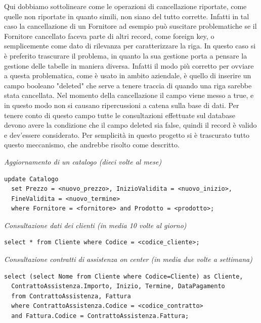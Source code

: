 \noindent
Qui dobbiamo sottolineare come le operazioni di cancellazione riportate, come quelle non riportate in quanto simili, non siano del tutto corrette. Infatti in tal caso la cancellazione di un Fornitore ad esempio può suscitare problematiche se il Fornitore cancellato faceva parte di altri record, come foreign key, o semplicemente come dato di rilevanza per caratterizzare la riga. In questo caso si è preferito trascurare il problema, in quanto la sua gestione porta a pensare la gestione delle tabelle in maniera diversa. Infatti il modo più corretto per ovviare a questa problematica, come è usato in ambito aziendale, è quello di inserire un campo booleano "deleted" che serve a tenere traccia di quando una riga sarebbe stata cancellata. Nel momento della cancellazione il campo viene messo a true, e in questo modo non si causano ripercussioni a catena sulla base di dati. Per tenere conto di questo campo tutte le consultazioni effettuate sul database devono avere la condizione che il campo deleted sia false, quindi il record è valido e dev'essere considerato. Per semplicità in questo progetto si è trascurato tutto questo meccanismo, che andrebbe risolto come descritto.
\vspace{1cm}

\noindent\textit{Aggiornamento di un catalogo (dieci volte al mese)}
\begin{verbatim}
update Catalogo
  set Prezzo = <nuovo_prezzo>, InizioValidita = <nuovo_inizio>,
  FineValidita = <nuovo_termine>
  where Fornitore = <fornitore> and Prodotto = <prodotto>;
\end{verbatim}
\vspace{1cm}

\noindent\textit{Consultazione dati dei clienti (in media 10 volte al giorno)}
\begin{verbatim}
select * from Cliente where Codice = <codice_cliente>;
\end{verbatim}
\vspace{1cm}

\noindent\textit{Consultazione contratti di assistenza on center (in media due volte a settimana)}
\begin{verbatim}
select (select Nome from Cliente where Codice=Cliente) as Cliente,
  ContrattoAssistenza.Importo, Inizio, Termine, DataPagamento
  from ContrattoAssistenza, Fattura
  where ContrattoAssistenza.Codice = <codice_contratto>
  and Fattura.Codice = ContrattoAssistenza.Fattura;
\end{verbatim}
\vspace{1cm}

